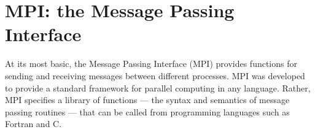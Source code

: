 \label{lab:MPI}

\begin{comment}
When a single processor takes too long to perform a computationally intensive task, there are two simple solutions.
The first is simply to build a faster processor.
Unfortunately, physics gets in the way.
In particular, the problem of heat dissipation has kept processor speeds from increasing as quickly in recent years as they did in the past.
The second solution is to have mutiple processors work together on the same task.
This is the main idea behind parallel computing.

Today, high computing performance is achieved using many processors.
These processors communicate with each other and coordinate their tasks with a message passing system. 
Essentially, a `supercomputer' is made up of many normal computers, each with its own memory. 
These normal computers are all running the same program, but each takes a different execution path through the code as a result of the interactions that message passing makes possible.

Taking advantage of parallel processors is challenging; one cannot simply take a traditional program and expect it to run faster on a supercomputer because such programs consists of a single process --- a set of instructions to be executed sequentially.
A parellel program must be written which consists of many processes which can be executed simultaneously.
\end{comment}

\section*{MPI: the Message Passing Interface}
At its most basic, the Message Passing Interface (MPI) provides functions for sending and receiving messages between different processes. 
MPI was developed to provide a standard framework for parallel computing in any language.
Rather, MPI specifies a library of functions --- the syntax and semantics of message passing routines --- that can be called from programming languages such as Fortran and C.

